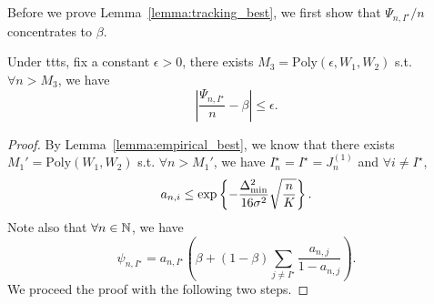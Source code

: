 Before we prove Lemma~\ref{lemma:tracking_best}, we first show that $\Psi_{n,I^\star}/n$ concentrates to $\beta$.

\begin{lemma}\label{lemma:psi_best}
    Under \gls{ttts}, fix a constant $\epsilon>0$, there exists $M_3 = \text{Poly}(\epsilon,W_1,W_2)$ s.t. $\forall n > M_3$, we have
    \[
        \left| \frac{\Psi_{n,I^\star}}{n}-\beta \right| \leq \epsilon.
    \]
\end{lemma}

\begin{proof}
    By Lemma~\ref{lemma:empirical_best}, we know that there exists $M_1' = \text{Poly}(W_1,W_2)$ s.t. $\forall n > M_1'$, we have $I_n^\star = I^\star = J_n^{(1)}$ and $\forall i \neq I^\star$,
    \[
        a_{n,i} \leq \exp\left\{-\frac{\Delta_{\text{min}}^2}{16\sigma^2}\sqrt{\frac{n}{K}}\right\}.
    \]
    Note also that $\forall n\in{\mathbb N}$, we have
    \[
        \psi_{n,I^\star} = a_{n,I^\star} \left(\beta + (1-\beta) \sum_{j\neq I^\star} \frac{a_{n,j}}{1-a_{n,j}}\right).
    \]
    We proceed the proof with the following two steps.
    

\end{proof}
